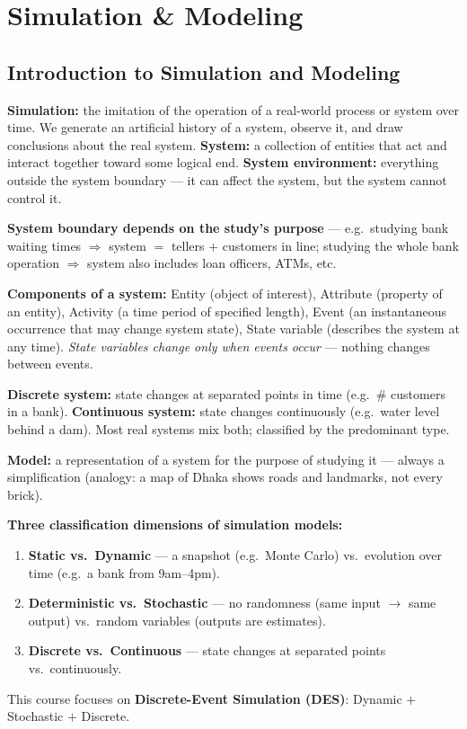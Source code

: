 \section{Simulation \& Modeling}

\subsection{Introduction to Simulation and Modeling}

\begin{defbox}
\textbf{Simulation:} the imitation of the operation of a real-world process or system over time. We generate an artificial history of a system, observe it, and draw conclusions about the real system. \textbf{System:} a collection of entities that act and interact together toward some logical end. \textbf{System environment:} everything outside the system boundary — it can affect the system, but the system cannot control it.
\end{defbox}

\textbf{System boundary depends on the study's purpose} — e.g.\ studying bank waiting times $\Rightarrow$ system $=$ tellers $+$ customers in line; studying the whole bank operation $\Rightarrow$ system also includes loan officers, ATMs, etc.

\textbf{Components of a system:} Entity (object of interest), Attribute (property of an entity), Activity (a time period of specified length), Event (an instantaneous occurrence that may change system state), State variable (describes the system at any time). \emph{State variables change only when events occur} — nothing changes between events.

\textbf{Discrete system:} state changes at separated points in time (e.g.\ \# customers in a bank). \textbf{Continuous system:} state changes continuously (e.g.\ water level behind a dam). Most real systems mix both; classified by the predominant type.

\begin{defbox}
\textbf{Model:} a representation of a system for the purpose of studying it — always a simplification (analogy: a map of Dhaka shows roads and landmarks, not every brick).
\end{defbox}

\textbf{Three classification dimensions of simulation models:}
\begin{enumerate}
\item \textbf{Static vs.\ Dynamic} — a snapshot (e.g.\ Monte Carlo) vs.\ evolution over time (e.g.\ a bank from 9am–4pm).
\item \textbf{Deterministic vs.\ Stochastic} — no randomness (same input $\to$ same output) vs.\ random variables (outputs are estimates).
\item \textbf{Discrete vs.\ Continuous} — state changes at separated points vs.\ continuously.
\end{enumerate}
This course focuses on \textbf{Discrete-Event Simulation (DES)}: Dynamic $+$ Stochastic $+$ Discrete.

